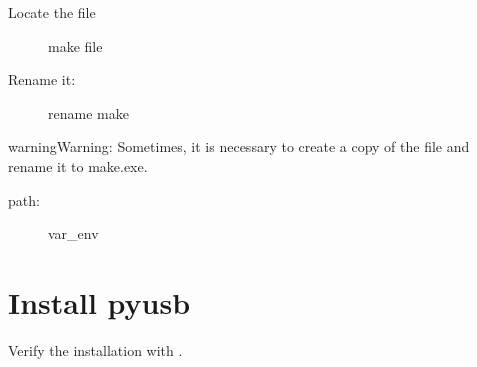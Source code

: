 \documentclass[letterpaper,10pt,english]{sphinxmanual}
\begin{document}
\begin{sphinxVerbatim}[commandchars=\\\{\}]
\PYGZbs{}\PYGZbs{}
\end{sphinxVerbatim}

\sphinxAtStartPar
Locate the file

\begin{figure}[htbp]
\centering
\capstart

\noindent{}
\caption{make file}\label{\detokenize{install_windows:id2}}\label{\detokenize{install_windows:make-file}}\end{figure}

\sphinxAtStartPar
Rename it:

\begin{figure}[htbp]
\centering
\capstart

\noindent{}
\caption{rename make}\label{\detokenize{install_windows:id3}}\label{\detokenize{install_windows:rename}}\end{figure}

\begin{sphinxadmonition}{warning}{Warning:}
\sphinxAtStartPar
Sometimes, it is necessary to create a copy of the file and rename it to make.exe.
\end{sphinxadmonition}

\sphinxAtStartPar
path:

\begin{sphinxVerbatim}[commandchars=\\\{\}]
\PYGZbs{}\PYGZbs{}\PYGZbs{}
\end{sphinxVerbatim}

\begin{figure}[htbp]
\centering
\capstart

\noindent{}
\caption{var\_env}\label{\detokenize{install_windows:id4}}\label{\detokenize{install_windows:var-env}}\end{figure}


\section{Install pyusb}
\label{\detokenize{install_windows:install-pyusb}}
\sphinxAtStartPar
Verify the installation with .
\end{document}
